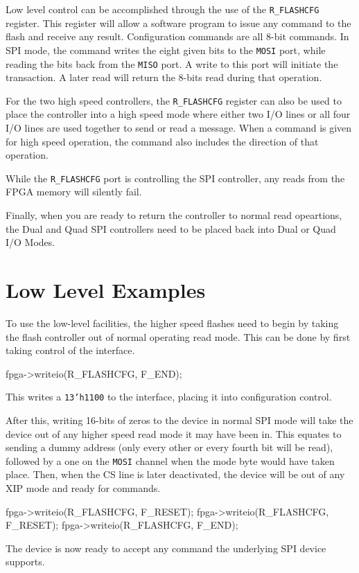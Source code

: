 \documentclass{gqtekspec}
\begin{document}
Low level control can be accomplished through the use of the {\tt R\_FLASHCFG}
register.  This register will allow a software program to issue any command
to the flash and receive any result. Configuration commands are all 8-bit
commands.  In SPI mode, the command writes the eight given bits to the
{\tt MOSI} port, while reading the bits back from the {\tt MISO} port.
A write to this port will initiate the transaction.  A later read will return
the 8-bits read during that operation.

For the two high speed controllers, the {\tt R\_FLASHCFG} register can also
be used to place the controller into a high speed mode where either two
I/O lines or all four I/O lines are used together to send or read a message.
When a command is given for high speed operation, the command also includes
the direction of that operation.

While the {\tt R\_FLASHCFG} port is controlling the SPI controller, any
reads from the FPGA memory will silently fail.

Finally, when you are ready to return the controller to normal read
opeartions, the Dual and Quad SPI controllers need to be placed back into
Dual or Quad I/O Modes.

\section{Low Level Examples}

To use the low-level facilities, the higher speed flashes need to begin by
taking the flash controller out of normal operating read mode.  This can
be done by first taking control of the interface.

fpga->writeio(R\_FLASHCFG, F\_END);

This writes a {\tt 13'h1100} to the interface, placing it into configuration
control.

After this, writing 16-bits of zeros to the device in normal SPI mode will
take the device out of any higher speed read mode it may have been in.  This
equates to sending a dummy address (only every other or every fourth bit will
be read), followed by a one on the {\tt MOSI} channel when the mode byte would
have taken place.  Then, when the CS line is later deactivated,
the device will be out of any XIP mode and ready for commands.

fpga->writeio(R\_FLASHCFG, F\_RESET);
fpga->writeio(R\_FLASHCFG, F\_RESET);
fpga->writeio(R\_FLASHCFG, F\_END);

The device is now ready to accept any command the underlying SPI device
supports.
\end{document}
